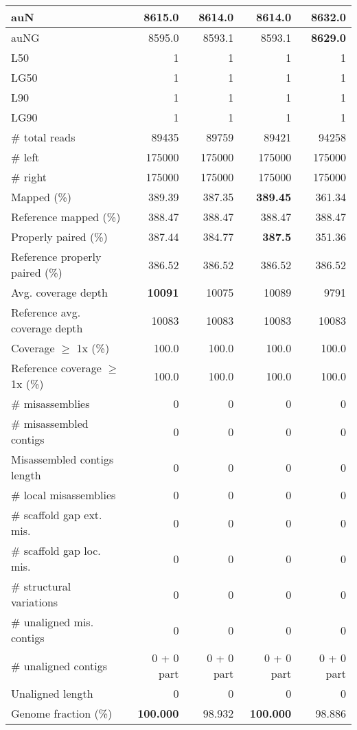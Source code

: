 \documentclass[12pt,a4paper]{article}
\begin{document}
\begin{table}[ht]
\begin{center}
\begin{tabular}{|l*{4}{|r}|}
auN & 8615.0 & 8614.0 & 8614.0 & {\bf 8632.0} \\ \hline
auNG & 8595.0 & 8593.1 & 8593.1 & {\bf 8629.0} \\ \hline
L50 & 1 & 1 & 1 & 1 \\ \hline
LG50 & 1 & 1 & 1 & 1 \\ \hline
L90 & 1 & 1 & 1 & 1 \\ \hline
LG90 & 1 & 1 & 1 & 1 \\ \hline
\# total reads & 89435 & 89759 & 89421 & 94258 \\ \hline
\# left & 175000 & 175000 & 175000 & 175000 \\ \hline
\# right & 175000 & 175000 & 175000 & 175000 \\ \hline
Mapped (\%) & 389.39 & 387.35 & {\bf 389.45} & 361.34 \\ \hline
Reference mapped (\%) & 388.47 & 388.47 & 388.47 & 388.47 \\ \hline
Properly paired (\%) & 387.44 & 384.77 & {\bf 387.5} & 351.36 \\ \hline
Reference properly paired (\%) & 386.52 & 386.52 & 386.52 & 386.52 \\ \hline
Avg. coverage depth & {\bf 10091} & 10075 & 10089 & 9791 \\ \hline
Reference avg. coverage depth & 10083 & 10083 & 10083 & 10083 \\ \hline
Coverage $\geq$ 1x (\%) & 100.0 & 100.0 & 100.0 & 100.0 \\ \hline
Reference coverage $\geq$ 1x (\%) & 100.0 & 100.0 & 100.0 & 100.0 \\ \hline
\# misassemblies & 0 & 0 & 0 & 0 \\ \hline
\# misassembled contigs & 0 & 0 & 0 & 0 \\ \hline
Misassembled contigs length & 0 & 0 & 0 & 0 \\ \hline
\# local misassemblies & 0 & 0 & 0 & 0 \\ \hline
\# scaffold gap ext. mis. & 0 & 0 & 0 & 0 \\ \hline
\# scaffold gap loc. mis. & 0 & 0 & 0 & 0 \\ \hline
\# structural variations & 0 & 0 & 0 & 0 \\ \hline
\# unaligned mis. contigs & 0 & 0 & 0 & 0 \\ \hline
\# unaligned contigs & 0 + 0 part & 0 + 0 part & 0 + 0 part & 0 + 0 part \\ \hline
Unaligned length & 0 & 0 & 0 & 0 \\ \hline
Genome fraction (\%) & {\bf 100.000} & 98.932 & {\bf 100.000} & 98.886 \\ \hline

\end{tabular}
\end{center}
\end{table}
\end{document}
